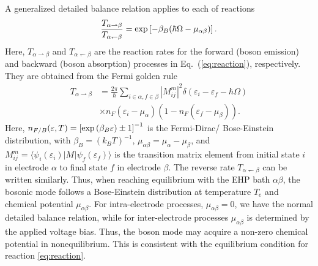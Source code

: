 \documentclass[aps,prb,
,floatfix,footinbib,shortbibliography,
preprint
]{revtex4-1}
\begin{document}
A generalized detailed balance relation applies to each of reactions
\begin{align}
\frac{T_{\alpha\rightharpoonup\beta}}{T_{\alpha\leftharpoondown\beta}} = {\rm exp}\left[-\beta_B(\hbar\Omega-\mu_{\alpha\beta})\right].
\end{align}
Here, $T_{\alpha\rightharpoonup\beta}$ and $T_{\alpha\leftharpoondown\beta}$ are the reaction rates for the forward (boson emission) and backward (boson absorption) processes in Eq.~(\ref{eq:reaction}), respectively. They are obtained from the Fermi golden rule
\begin{align}
T_{\alpha\rightharpoonup\beta} &= \frac{2\pi}{\hbar}\sum_{i\in\alpha,f\in\beta}|M^m_{ij}|^2  \delta(\varepsilon_i-\varepsilon_f-\hbar\Omega)  \nonumber\\
&\times n_F(\varepsilon_i-\mu_\alpha)(1-n_F(\varepsilon_f-\mu_\beta)).
\end{align}
Here, $n_{F/B}(\varepsilon,T) = \left[{\rm exp}\left(\beta_B \varepsilon\right)\pm 1\right]^{-1}$ is the Fermi-Dirac/ Bose-Einstein distribution, with $\beta_B=(k_BT)^{-1}$,  $\mu_{\alpha\beta}=\mu_\alpha-\mu_\beta$, and $M^m_{ij}=\langle \psi_{i}(\varepsilon_i)|M^{}|\psi_{f}(\varepsilon_f)\rangle$ is the transition matrix element from initial state $i$ in electrode $\alpha$ to final state $f$ in electrode $\beta$. The reverse rate $T_{\alpha\leftharpoondown\beta}$ can be written similarly.
Thus, when reaching equilibrium with the EHP bath $\alpha\beta$, the bosonic mode follows a Bose-Einstein distribution at temperature $T_e$ and chemical potential $\mu_{\alpha\beta}$. For intra-electrode processes, $\mu_{\alpha\beta}=0$, we have the normal detailed balance relation, while for inter-electrode processes $\mu_{\alpha\beta}$ is determined by the applied voltage bias. Thus, the boson mode may acquire a non-zero chemical potential in nonequilibrium. This is consistent with the equilibrium condition for reaction \ref{eq:reaction}.


\end{document}
